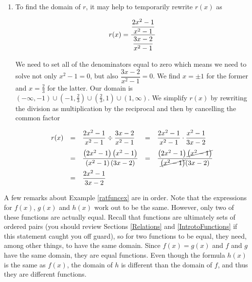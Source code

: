 {\begin{enumerate}
\[ \begin{array}{rclcl}

h(x) & = & \dfrac{2x^2-1}{x^2-1} - \dfrac{3x-2}{x^2-1} & = & \dfrac{\left(2x^2-1\right) - \left(3x-2\right)}{x^2-1} \\ [.15in]
     & = & \dfrac{2x^2-1 - 3x+2}{x^2-1} & = &  \dfrac{2x^2 - 3x+1}{x^2-1} \\ [.15in]
     & = & \dfrac{(2x-1)(x-1)}{(x+1)(x-1)} & = & \dfrac{(2x-1)\cancel{(x-1)}}{(x+1)\cancel{(x-1)}} \\ [.15in]
     & = & \dfrac{2x-1}{x+1} & & 
\end{array} \]

\item  To find the domain of $r$, it may help to temporarily rewrite $r(x)$ as

\[ r(x) = \dfrac{\dfrac{2x^2-1}{x^2-1} }{\dfrac{3x-2}{x^2-1}\vphantom{\left(\dfrac{X}{X}\right)}}\]

We need to set all of the denominators equal to zero which means we need to solve not only  $x^2-1= 0$, but also $\dfrac{3x-2}{x^2-1}=0$.  We find $x = \pm 1$ for the former and $x= \frac{2}{3}$ for the latter.  Our domain is $(-\infty, -1) \cup \left(-1,\frac{2}{3}\right) \cup \left(\frac{2}{3},1\right) \cup (1, \infty)$.  We simplify $r(x)$ by rewriting the division as multiplication by the reciprocal and then by cancelling the common factor

\[ \begin{array}{rclcl}

r(x) & = & \dfrac{2x^2-1}{x^2-1} \div \dfrac{3x-2}{x^2-1} & = & \dfrac{2x^2-1}{x^2-1} \cdot \dfrac{x^2-1}{3x-2}\\[.15in]
 & = & \dfrac{\left(2x^2-1\right)\left(x^2-1\right)}{\left(x^2-1\right)(3x-2)} & = & \dfrac{\left(2x^2-1\right)\cancel{\left(x^2-1\right)}}{\cancel{\left(x^2-1\right)}(3x-2)}\\[.15in]
  & = & \dfrac{2x^2-1}{3x-2}   & &
\end{array}\]

\end{enumerate}
}

\medskip

A few remarks about Example \ref{ratfuncex} are in order. Note that the expressions for $f(x)$, $g(x)$ and $h(x)$ work out to be the same.  However, only two of these functions are actually equal.  Recall that functions are ultimately sets of ordered pairs (you should review Sections \ref{Relations} and \ref{IntrotoFunctions} if this statement caught you off guard), so for two functions to be equal, they need, among other things, to have the same domain.  Since $f(x) = g(x)$ and $f$ and $g$ have the same domain, they are equal functions.  Even though the formula $h(x)$ is the same as $f(x)$, the domain of $h$ is different than the domain of $f$, and thus they are different functions.  

